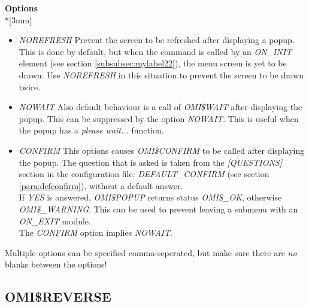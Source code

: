 \documentclass[a4paper]{book}
\begin{document}
\textbf{Options}\\*[3mm]

\begin{itemize}
\item \textsl{NOREFRESH} Prevent the screen to be refreshed after displaying a popup.
This is done by default, but when the command is called by an 
\textsl{ON{\_}INIT} element (see section \ref{subsubsec:mylabel22}), the menu 
screen is yet to be drawn. Use \textsl{NOREFRESH} in this situation to prevent the screen to be drawn twice.

\item \textsl{NOWAIT} Also default behaviour is a call of \textsl{OMI{\$}WAIT} after displaying
the popup. This can be suppressed by the option \textsl{NOWAIT}. This is useful
when the popup has a \textit{please wait...} function.

\item \textsl{CONFIRM} This options causes \textsl{OMI{\$}CONFIRM} to be called after displaying the popup. The  question that is asked is taken from the \textsl{[QUESTIONS]} section in the configuration file: \textsl{DEFAULT{\_}CONFIRM} (see section \ref{para:defconfirm}), without a default answer.\\
If \textsl{YES} is answered, \textsl{OMI{\$}POPUP} returns status \textsl{OMI{\$}{\_}OK}, otherwise \textsl{OMI{\$}{\_}WARNING}. This can be used to prevent leaving a submenu with an \textsl{ON{\_}EXIT} module.\\
The \textsl{CONFIRM} option implies \textsl{NOWAIT}.

\end{itemize}

Multiple options can be specified comma-seperated, but make sure there are \textit{no}
blanks between the options!

\subsection{OMI{\$}REVERSE}
\label{subsubsec:mylabel60}
\end{document}
